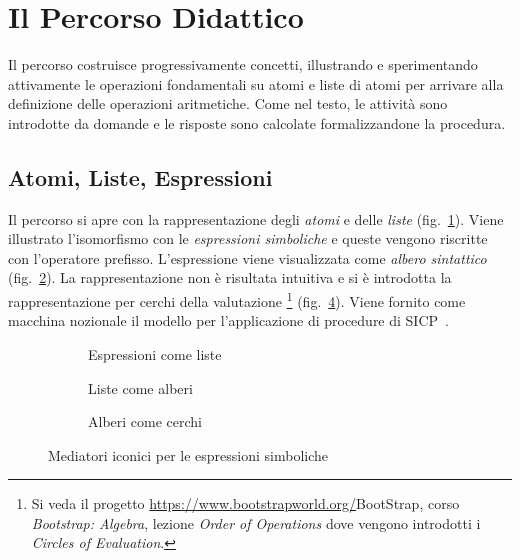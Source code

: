 \documentclass[withtimes]{easychair}
\begin{document}
\section{Il Percorso Didattico}\label{il-percorso-didattico}

Il percorso costruisce progressivamente concetti, illustrando e sperimentando attivamente le operazioni fondamentali su atomi e liste di atomi per arrivare alla definizione delle operazioni aritmetiche. Come nel testo, le attività sono introdotte da domande e le risposte sono calcolate formalizzandone la procedura.

\subsection{Atomi, Liste, Espressioni}\label{strutture-dati-e-espressioni}

Il percorso si apre con la rappresentazione degli \emph{atomi} e delle \emph{liste} (fig.~\ref{fig:lista}). Viene illustrato l'isomorfismo con le \emph{espressioni simboliche} e queste vengono riscritte con l'operatore prefisso. L'espressione viene visualizzata come \emph{albero sintattico} (fig.~\ref{fig:albero}). La rappresentazione non è risultata intuitiva e si è introdotta la rappresentazione per cerchi della valutazione \footnote{Si veda il progetto \url{https://www.bootstrapworld.org/}{BootStrap}, corso \emph{Bootstrap: Algebra}, lezione \emph{Order of Operations} dove vengono introdotti i \emph{Circles of Evaluation}.} (fig.~\ref{fig:cerchio}). Viene fornito come macchina nozionale il modello per l'applicazione di procedure di SICP~\cite[par.~\mbox{1.1.5} The Substitution Model for Procedure Application]{Abelson1996}.

\begin{figure}
    \centering

    \begin{subfigure}[t]{0.8\textwidth}
      \centering
      
      \caption{Espressioni come liste\label{fig:lista}}
    \end{subfigure}

    \vspace{1em}

    \begin{minipage}{0.8\textwidth}
      \centering
      \begin{subfigure}[b]{0.35\textwidth}
        \centering
        
        \caption{Liste come alberi\label{fig:albero}}
      \end{subfigure}
      \quad
      \begin{subfigure}[b]{0.35\textwidth}
        \centering
        
        \caption{Alberi come cerchi\label{fig:cerchio}}
      \end{subfigure}
    \end{minipage}

  \caption{Mediatori iconici per le espressioni simboliche}
\end{figure}
\end{document}
